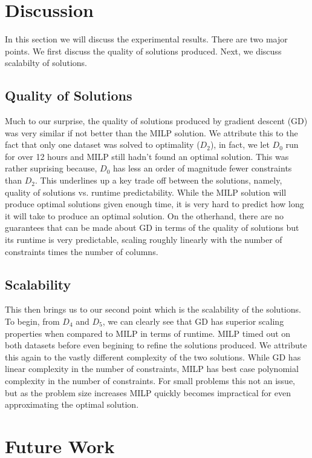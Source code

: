 \documentclass[a4paper]{article}
\begin{document}
\section{Discussion}

In this section we will discuss the experimental results. There are
two major points. We first discuss the quality of solutions produced. 
Next, we discuss scalabilty of solutions.

\subsection{Quality of Solutions}

Much to our surprise, the quality of solutions produced by gradient descent
(GD) was very similar if not better than the MILP solution. We attribute this
to the fact that only one dataset was solved to optimality ($D_2$), in fact, we
let $D_0$ run for over 12 hours and MILP still hadn't found an optimal
solution. This was rather suprising because, $D_0$ has less an order of
magnitude fewer constraints than $D_2$. This underlines up a key trade off
between the solutions, namely, quality of solutions vs. runtime predictability.
While the MILP solution will produce optimal solutions given enough time, it is
very hard to predict how long it will take to produce an optimal solution. On
the otherhand, there are no guarantees that can be made about GD in terms of
the quality of solutions but its runtime is very predictable, scaling roughly
linearly with the number of constraints times the number of columns. 

\subsection{Scalability}

This then brings us to our second point which is the scalability of the 
solutions. To begin, from $D_4$ and $D_5$, we can clearly see that 
GD has superior scaling properties when compared to MILP in terms of 
runtime. MILP timed out on both datasets before even begining to refine the 
solutions produced. We attribute this again to the vastly different complexity of the 
two solutions. While GD has linear complexity in the number of constraints, 
MILP has best case polynomial complexity in the number of constraints.  For small 
problems this not an issue, but as the problem size increases MILP quickly becomes
impractical for even approximating the optimal solution. 

\section{Future Work}
\end{document}
